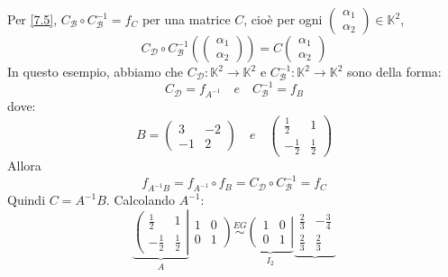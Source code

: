 \documentclass[a4paper]{article}
\theoremstyle{break}
\theoremstyle{break}
\theoremstyle{break}
\theoremstyle{break}
\begin{document}
\begin{example}
\begin{figure}[H]
\end{figure}

\noindent Per \ref{7.5}, \( C_{\mathcal{B}} \circ C_{\mathcal{B}}^{-1} = f_C \) per una matrice
\( C \), cioè per ogni \( \begin{pmatrix} \alpha_1\\ \alpha_2 \end{pmatrix} \in \mathbb{K}^2 \),
\[
  C_{\mathcal{D}} \circ C_{\mathcal{B}}^{-1} \left( \begin{pmatrix} 
      \alpha_1\\
      \alpha_2
  \end{pmatrix}  \right) = C \begin{pmatrix} 
    \alpha_1\\
    \alpha_2
  \end{pmatrix}
\] 
In questo esempio, abbiamo che \( C_{\mathcal{D}}: \mathbb{K}^2 \to \mathbb{K}^2 \) e
\( C_{\mathcal{B}}^{-1}: \mathbb{K}^2 \to \mathbb{K}^2 \) sono della forma:
\[
  C_{\mathcal{D}} = f_{A^{-1}} \quad e \quad C_{\mathcal{B}}^{-1} = f_B
\] 
dove:
\[
  B = \begin{pmatrix} 
    3 & -2\\
    -1 & 2
  \end{pmatrix} 
  \quad e \quad
  \begin{pmatrix} 
    \frac{1}{2} & 1\\
    -\frac{1}{2} & \frac{1}{2}
  \end{pmatrix} 
\] 
Allora 
\[
  f_{A^{-1}B} = f_{A^{-1}} \circ f_B = C_{\mathcal{D}} \circ C_{\mathcal{B}}^{-1} = f_C
\] 
Quindi \( C = A^{-1}B \). Calcolando \( A^{-1} \):
\[
  \underbrace{
  \left(
  \begin{array}{cc}
    \frac{1}{2} & 1\\
    -\frac{1}{2} & \frac{1}{2}
  \end{array}
  \right|
  }_{A}
    \left.
      \begin{array}{cc}
        1 & 0\\
        0 & 1
      \end{array}
    \right)
    \stackrel{EG}{\sim}
  \underbrace{
  \left(
  \begin{array}{cc}
    1 & 0\\
    0 & 1
  \end{array}
  \right|
  }_{I_2}
  \underbrace{
    \left.
      \begin{array}{cc}
        \frac{2}{3} & -\frac{3}{4}\\
        \frac{2}{3} & \frac{2}{3}
      \end{array}
}\]
\end{example}
\end{document}
